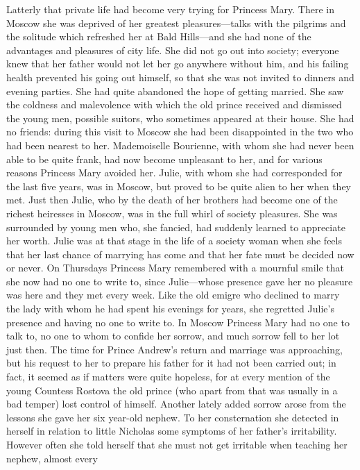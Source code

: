 Latterly that private life had become very trying for Princess
Mary.  There in Moscow she was deprived of her greatest
pleasures---talks with the pilgrims and the solitude which
refreshed her at Bald Hills---and she had none of the advantages
and pleasures of city life. She did not go out into society;
everyone knew that her father would not let her go anywhere
without him, and his failing health prevented his going out
himself, so that she was not invited to dinners and evening
parties. She had quite abandoned the hope of getting married. She
saw the coldness and malevolence with which the old prince
received and dismissed the young men, possible suitors, who
sometimes appeared at their house. She had no friends: during
this visit to Moscow she had been disappointed in the two who had
been nearest to her. Mademoiselle Bourienne, with whom she had
never been able to be quite frank, had now become unpleasant to
her, and for various reasons Princess Mary avoided her. Julie,
with whom she had corresponded for the last five years, was in
Moscow, but proved to be quite alien to her when they met. Just
then Julie, who by the death of her brothers had become one of
the richest heiresses in Moscow, was in the full whirl of society
pleasures. She was surrounded by young men who, she fancied, had
suddenly learned to appreciate her worth.  Julie was at that
stage in the life of a society woman when she feels that her last
chance of marrying has come and that her fate must be decided now
or never. On Thursdays Princess Mary remembered with a mournful
smile that she now had no one to write to, since Julie---whose
presence gave her no pleasure was here and they met every
week. Like the old emigre who declined to marry the lady with
whom he had spent his evenings for years, she regretted Julie's
presence and having no one to write to. In Moscow Princess Mary
had no one to talk to, no one to whom to confide her sorrow, and
much sorrow fell to her lot just then. The time for Prince
Andrew's return and marriage was approaching, but his request to
her to prepare his father for it had not been carried out; in
fact, it seemed as if matters were quite hopeless, for at every
mention of the young Countess Rostova the old prince (who apart
from that was usually in a bad temper) lost control of
himself. Another lately added sorrow arose from the lessons she
gave her six year-old nephew. To her consternation she detected
in herself in relation to little Nicholas some symptoms of her
father's irritability. However often she told herself that she
must not get irritable when teaching her nephew, almost every

